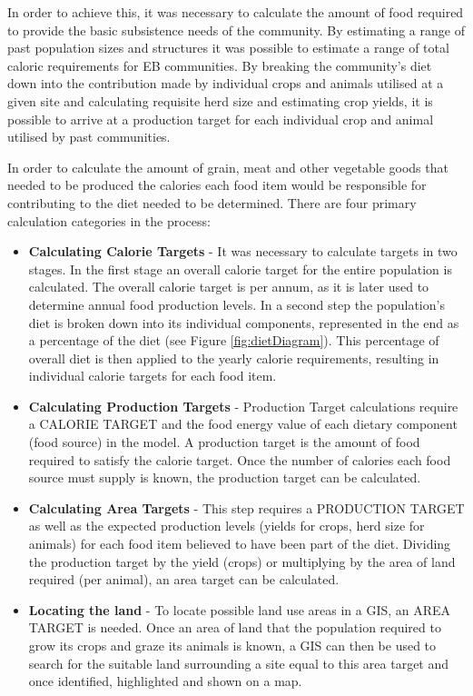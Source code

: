 In order to achieve this, it was necessary to calculate the amount of food required to provide the basic subsistence needs of the community.  By estimating a range of past population sizes and structures it was possible to estimate a range of total caloric requirements for EB communities. By breaking the community's diet down into the contribution made by individual crops and animals utilised at a given site and calculating requisite herd size and estimating crop yields, it is possible to arrive at a production target for each individual crop and animal utilised by past communities. 

In order to calculate the amount of grain, meat and other vegetable goods that needed to be produced the calories each food item would be responsible for contributing to the diet needed to be determined. There are four primary calculation categories in the process: 
\begin{itemize}
	\item \textbf{Calculating Calorie Targets} - It was necessary to calculate targets in two stages. In the first stage an overall calorie target for the entire population is calculated.  The overall calorie target is per annum, as it is later used to determine annual food production levels.  In a second step the population's diet is broken down into its individual components, represented in the end as a percentage of the diet (see Figure \ref{fig:dietDiagram}).  This percentage of overall diet is then applied to the yearly calorie requirements, resulting in individual calorie targets for each food item.
	\item \textbf{Calculating Production Targets} - Production Target calculations require a CALORIE TARGET and the food energy value of each dietary component (food source) in the model. A production target is the amount of food required to satisfy the calorie target.  Once the number of calories each food source must supply is known, the production target can be calculated.
	\item \textbf{Calculating Area Targets} - This step requires a PRODUCTION TARGET as well as the expected production levels (yields for crops, herd size for animals) for each food item believed to have been part of the diet. Dividing the production target by the yield (crops) or multiplying by the area of land required (per animal), an area target can be calculated. 
	\item \textbf{Locating the land} - To locate possible land use areas in a GIS, an AREA TARGET is needed. Once an area of land that the population required to grow its crops and graze its animals is known, a GIS can then be used to search for the suitable land surrounding a site equal to this area target and once identified, highlighted and shown on a map. 
\end{itemize}

